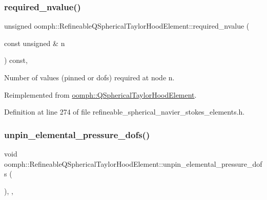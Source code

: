 \subsubsection{\texorpdfstring{required\+\_\+nvalue()}{required\_nvalue()}}
{\footnotesize\ttfamily unsigned oomph\+::\+Refineable\+Q\+Spherical\+Taylor\+Hood\+Element\+::required\+\_\+nvalue (\begin{DoxyParamCaption}\item[{const unsigned \&}]{n }\end{DoxyParamCaption}) const\hspace{0.3cm}{\ttfamily [inline]}, {\ttfamily [virtual]}}



Number of values (pinned or dofs) required at node n. 



Reimplemented from \hyperlink{classoomph_1_1QSphericalTaylorHoodElement_a900be4fc6f5710905e8f562ca5a76c3d}{oomph\+::\+Q\+Spherical\+Taylor\+Hood\+Element}.



Definition at line 274 of file refineable\+\_\+spherical\+\_\+navier\+\_\+stokes\+\_\+elements.\+h.

\mbox{\label{classoomph_1_1RefineableQSphericalTaylorHoodElement_af90c9272d1d4ba4983141effe918d135}} 
\subsubsection{\texorpdfstring{unpin\+\_\+elemental\+\_\+pressure\+\_\+dofs()}{unpin\_elemental\_pressure\_dofs()}}
{\footnotesize\ttfamily void oomph\+::\+Refineable\+Q\+Spherical\+Taylor\+Hood\+Element\+::unpin\+\_\+elemental\+\_\+pressure\+\_\+dofs (\begin{DoxyParamCaption}{ }\end{DoxyParamCaption})\hspace{0.3cm}{\ttfamily [inline]}, {\ttfamily [private]}, {\ttfamily [virtual]}}



